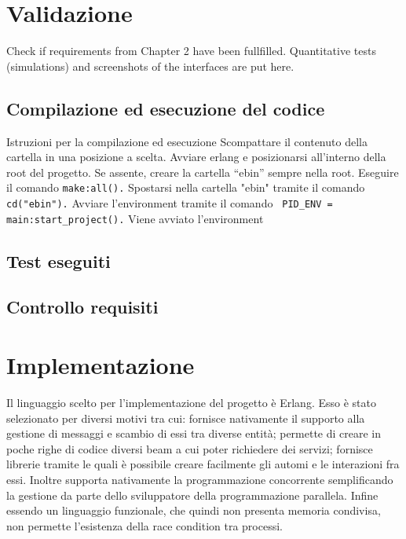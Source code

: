 
\chapter{Validazione}

Check if requirements from Chapter 2 have been fullfilled. Quantitative tests (simulations) and screenshots of the interfaces are put here.

\section{Compilazione ed esecuzione del codice}

Istruzioni per la compilazione ed esecuzione
Scompattare il contenuto della cartella in una posizione a scelta. 
Avviare erlang e posizionarsi all'interno della root del progetto. 
Se assente, creare la cartella ``ebin'' sempre nella root.
Eseguire il comando
\lstinline|make:all().|
Spostarsi nella cartella "ebin" tramite il comando
\lstinline|cd("ebin").|
Avviare l'environment tramite il comando
\lstinline| PID_ENV = main:start_project().|
Viene avviato l'environment 


\section{Test eseguiti}

\section{Controllo requisiti}

\chapter{Implementazione}

Il linguaggio scelto per l'implementazione del progetto è Erlang. Esso è stato selezionato per diversi motivi tra cui: fornisce nativamente il supporto alla gestione di messaggi e scambio di essi tra diverse entità; permette di creare in poche righe di codice diversi beam a cui poter richiedere dei servizi; fornisce librerie tramite le quali è possibile creare facilmente gli automi e le interazioni fra essi. Inoltre supporta nativamente la programmazione concorrente semplificando la gestione da parte dello sviluppatore della programmazione parallela. Infine essendo un linguaggio funzionale, che quindi non presenta memoria condivisa, non permette l'esistenza della race condition tra processi.

